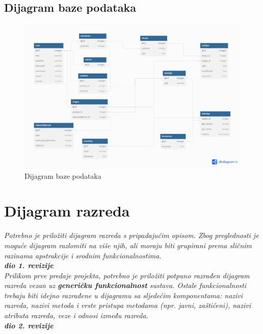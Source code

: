 			\subsection{Dijagram baze podataka}
				\begin{figure}[H]
					\includegraphics[scale=0.35]{slike/dijagram_baze_podataka.png}
					\centering
					\caption{Dijagram baze podataka}
					\label{fig:promjene}
				\end{figure}
			\eject
			
			
		\section{Dijagram razreda}
		
			\textit{Potrebno je priložiti dijagram razreda s pripadajućim opisom. Zbog preglednosti je moguće dijagram razlomiti na više njih, ali moraju biti grupirani prema sličnim razinama apstrakcije i srodnim funkcionalnostima.}\\
			
			\textbf{\textit{dio 1. revizije}}\\
			
			\textit{Prilikom prve predaje projekta, potrebno je priložiti potpuno razrađen dijagram razreda vezan uz \textbf{generičku funkcionalnost} sustava. Ostale funkcionalnosti trebaju biti idejno razrađene u dijagramu sa sljedećim komponentama: nazivi razreda, nazivi metoda i vrste pristupa metodama (npr. javni, zaštićeni), nazivi atributa razreda, veze i odnosi između razreda.}\\
			
			\textbf{\textit{dio 2. revizije}}\\			
			
